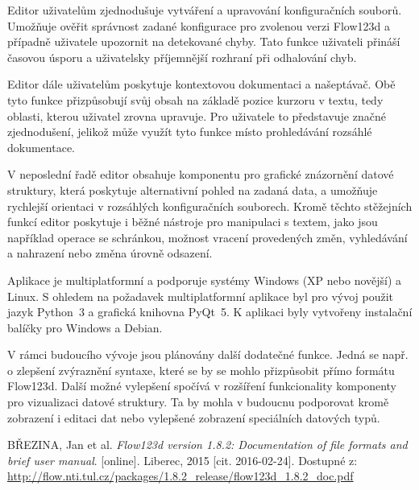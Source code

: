 \documentclass[FM,bw,DP]{tulthesis}
\begin{document}
Editor uživatelům zjednodušuje vytváření a upravování konfiguračních souborů. Umožňuje ověřit správnost zadané konfigurace pro zvolenou verzi Flow123d a případně uživatele upozornit na detekované chyby. Tato funkce uživateli přináší časovou úsporu a uživatelsky příjemnější rozhraní při odhalování chyb.

Editor dále uživatelům poskytuje kontextovou dokumentaci a našeptávač. Obě tyto funkce přizpůsobují svůj obsah na základě pozice kurzoru v textu, tedy oblasti, kterou uživatel zrovna upravuje. Pro uživatele to představuje značné zjednodušení, jelikož může využít tyto funkce místo prohledávání rozsáhlé dokumentace.

V neposlední řadě editor obsahuje komponentu pro grafické znázornění datové struktury, která poskytuje alternativní pohled na zadaná data, a umožňuje rychlejší orientaci v rozsáhlých konfiguračních souborech. Kromě těchto stěžejních funkcí editor poskytuje i běžné nástroje pro manipulaci s textem, jako jsou například operace se schránkou, možnost vracení provedených změn, vyhledávání a nahrazení nebo změna úrovně odsazení.

Aplikace je multiplatformní a podporuje systémy Windows (XP nebo novější) a Linux. S ohledem na požadavek multiplatformní aplikace byl pro vývoj použit jazyk Python~3 a grafická knihovna PyQt~5. K aplikaci byly vytvořeny instalační balíčky pro Windows a Debian.

V rámci budoucího vývoje jsou plánovány další dodatečné funkce. Jedná se např. o zlepšení zvýraznění syntaxe, které se by se mohlo přizpůsobit přímo formátu Flow123d. Další možné vylepšení spočívá v rozšíření funkcionality komponenty pro vizualizaci datové struktury. Ta by mohla v budoucnu podporovat kromě zobrazení i editaci dat nebo vylepšené zobrazení speciálních datových typů.

\begin{thebibliography}{9}


BŘEZINA, Jan et al. \textit{Flow123d version 1.8.2: Documentation of file formats and brief user manual}. [online]. Liberec, 2015 [cit. 2016-02-24]. Dostupné z: \url{http://flow.nti.tul.cz/packages/1.8.2_release/flow123d_1.8.2_doc.pdf}
	
\end{thebibliography}
\end{document}
